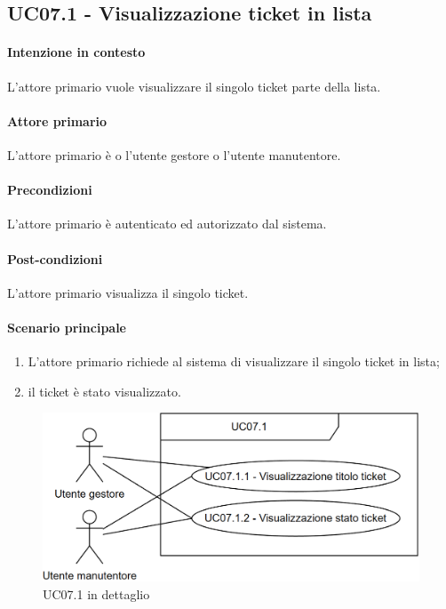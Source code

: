 \subsection{UC07.1 - Visualizzazione ticket in lista}\label{uc:07.1}
\paragraph{Intenzione in contesto} L'attore primario vuole visualizzare il singolo ticket parte della lista.
\paragraph{Attore primario} L'attore primario è o l'utente gestore o l'utente manutentore.
\paragraph{Precondizioni}  L'attore primario è autenticato ed autorizzato dal sistema.
\paragraph{Post-condizioni} L'attore primario visualizza il singolo ticket.
\paragraph{Scenario principale}
\begin{enumerate}
    \item L'attore primario richiede al sistema di visualizzare il singolo ticket in lista;
    \item il ticket è stato visualizzato.
\end{enumerate}

\begin{figure}[h]
    \includegraphics[width=\textwidth]{contenuti/img/casi_uso_grafici-uc07.1.png}
    \caption{UC07.1 in dettaglio}
    \label{fig:uc07.1}
\end{figure}

